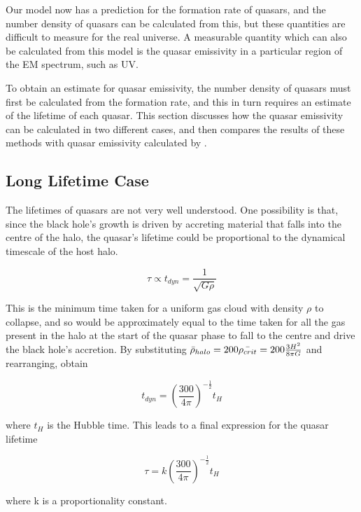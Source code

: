 \documentclass[12pt, twocolumn]{report}%
\begin{document}
Our model now has a prediction for the formation rate of quasars, and the number density of quasars can be calculated from this, but these quantities are difficult to measure for the real universe. A measurable quantity which can also be calculated from this model is the quasar emissivity in a particular region of the EM spectrum, such as UV.\par

To obtain an estimate for quasar emissivity, the number density of quasars must first be calculated from the formation rate, and this in turn requires an estimate of the lifetime of each quasar. This section discusses how the quasar emissivity can be calculated in two different cases, and then compares the results of these methods with quasar emissivity calculated by \cite{Haardt_Madau}.

\subsection{Long Lifetime Case}

The lifetimes of quasars are not very well understood. One possibility is that, since the black hole’s growth is driven by accreting material that falls into the centre of the halo, the quasar’s lifetime could be proportional to the dynamical timescale of the host halo.

\begin{equation}
    \tau\propto t_{dyn}=\frac{1}{\sqrt{G\rho}}
\end{equation}

\noindent This is the minimum time taken for a uniform gas cloud with density $\rho$ to collapse, and so would be approximately equal to the time taken for all the gas present in the halo at the start of the quasar phase to fall to the centre and drive the black hole’s accretion. By substituting $\Bar{\rho}_{halo}=200\Bar{\rho_{crit}}=200\frac{3H^2}{8\pi G}$ and rearranging, obtain

\begin{equation}
    t_{dyn}=\left(\frac{300}{4\pi}\right)^{-\frac{1}{2}}t_H
\end{equation}

\noindent where $t_H$ is the Hubble time. This leads to a final expression for the quasar lifetime

\begin{equation}
    \tau=k\left(\frac{300}{4\pi}\right)^{-\frac{1}{2}}t_H
\end{equation}

\noindent where k is a proportionality constant.\par
\end{document}
